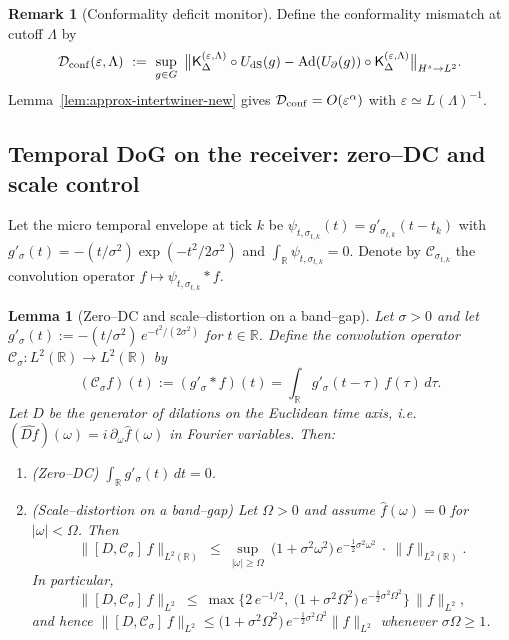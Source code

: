 \documentclass[10pt]{article}
\theoremstyle{definition}
\newtheorem{remark}{Remark}[section]
\theoremstyle{plain}
\newtheorem{lemma}{Lemma}[section]
\begin{document}
\begin{remark}[Conformality deficit monitor]
\label{rem:conf-monitor}
Define the conformality mismatch at cutoff $\Lambda$ by
\[
\mathcal D_{\rm conf}(\varepsilon,\Lambda)\ :=\ 
\sup_{g\in G}\ \big\|{\sf K}_\Delta^{(\varepsilon,\Lambda)} \circ U_{\rm dS}(g)
- \mathrm{Ad}(U_\partial(g))\circ {\sf K}_\Delta^{(\varepsilon,\Lambda)}\big\|_{H^s\to L^2}.
\]
Lemma~\ref{lem:approx-intertwiner-new} gives $\mathcal D_{\rm conf}=O(\varepsilon^\alpha)$ with $\varepsilon\simeq L(\Lambda)^{-1}$.
\end{remark}

\subsection{Temporal DoG on the receiver: zero–DC and scale control}
\label{app:dog-temporal}

Let the micro temporal envelope at tick $k$ be $\psi_{t,\sigma_{t,k}}(t)=g'_{\sigma_{t,k}}(t-t_k)$ with
$g'_{\sigma}(t)=-(t/\sigma^2)\exp(-t^2/2\sigma^2)$ and $\int_{\mathbb R}\psi_{t,\sigma_{t,k}}=0$.
Denote by $\mathcal C_{\sigma_{t,k}}$ the convolution operator $f\mapsto \psi_{t,\sigma_{t,k}}*f$.

\begin{lemma}[Zero--DC and scale--distortion on a band--gap]\label{lem:DoG-comm-new}
Let $\sigma>0$ and let $g'_\sigma(t):=-(t/\sigma^2)\,e^{-t^2/(2\sigma^2)}$ for $t\in\mathbb R$.
Define the convolution operator $\mathcal C_\sigma:L^2(\mathbb R)\to L^2(\mathbb R)$ by
\[
(\mathcal C_\sigma f)(t):=(g'_\sigma*f)(t)=\int_{\mathbb R} g'_\sigma(t-\tau)\,f(\tau)\,d\tau.
\]
Let $D$ be the generator of dilations on the Euclidean time axis, i.e.\ $(\widehat{Df})(\omega)=i\,\partial_\omega \widehat f(\omega)$ in Fourier variables.
Then:
\begin{enumerate}
\item[\emph{(a)}] (\emph{Zero--DC}) $\displaystyle \int_{\mathbb R} g'_\sigma(t)\,dt=0$.
\item[\emph{(b)}] (\emph{Scale--distortion on a band--gap}) Let $\Omega>0$ and assume $\widehat f(\omega)=0$ for $|\omega|<\Omega$. Then
\begin{equation}\label{eq:DoG-comm-main}
\|[D,\mathcal C_\sigma]\,f\|_{L^2(\mathbb R)}\ \le\ \sup_{|\omega|\ge \Omega}\ \big(1+\sigma^2\omega^2\big)\,e^{-\frac12\sigma^2\omega^2}\ \cdot\ \|f\|_{L^2(\mathbb R)}.
\end{equation}
In particular,
\begin{equation}\label{eq:DoG-comm-decay}
\|[D,\mathcal C_\sigma]\,f\|_{L^2}\ \le\ \max\!\Big\{2\,e^{-1/2},\ \big(1+\sigma^2\Omega^2\big)\,e^{-\frac12\sigma^2\Omega^2}\Big\}\,\|f\|_{L^2},
\end{equation}
and hence $\|[D,\mathcal C_\sigma]\,f\|_{L^2}\le \big(1+\sigma^2\Omega^2\big)\,e^{-\frac12\sigma^2\Omega^2}\|f\|_{L^2}$ whenever $\sigma\Omega\ge 1$.
\end{enumerate}
\end{lemma}
\end{document}
